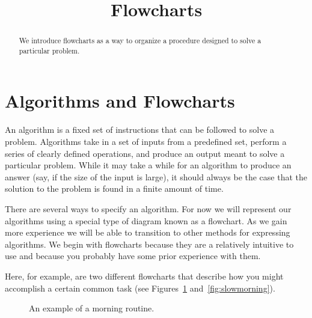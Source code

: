 \documentclass{ximera}
\title{Flowcharts}
\begin{document}
\begin{abstract}
We introduce flowcharts as a way to organize a procedure designed to solve a particular problem.
\end{abstract}
\maketitle

\section{Algorithms and Flowcharts}
An algorithm is a fixed set of instructions that can be followed to solve a problem. Algorithms take in a set of inputs from a predefined set, perform a series of clearly defined operations, and produce an output meant to solve a particular problem. While it may take a while for an algorithm to produce an answer (say, if the size of the input is large), it should always be the case that the solution to the problem is found in a finite amount of time.

There are several ways to specify an algorithm. For now we will represent our algorithms using a special type of diagram known as a flowchart. As we gain more experience we will be able to transition to other methods for expressing algorithms. We begin with flowcharts because they are a relatively intuitive to use and because you probably have some prior experience with them.

Here, for example, are two different flowcharts that describe how you might accomplish a certain common task (see Figures~\ref{fig:fastmorning} and~\ref{fig:slowmorning}).

\begin{figure}
\centering
	\caption{An example of a morning routine.}\label{fig:fastmorning}
\end{figure}
\end{document}
